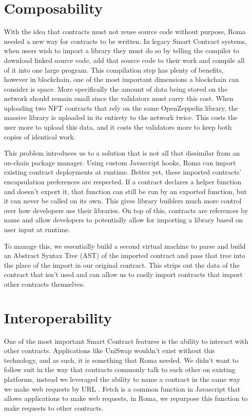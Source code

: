 \documentclass[a4paper]{article}
\begin{document}
\section{Composability}\label{sec:composability}
With the idea that contracts must not reuse source code without purpose, Roma needed a new way for contracts to be written.
In legacy Smart Contract systems, when users wish to import a library they must do so by telling the compiler to download linked source code, add that source code to their work and compile all of it into one large program.
This compilation step has plenty of benefits, however in blockchain, one of the most important dimensions a blockchain can consider is space.
More specifically the amount of data being stored on the network should remain small since the validators must carry this cost.
When uploading two NFT contracts that rely on the same OpenZeppelin library, the massive library is uploaded in its entirety to the network twice.
This costs the user more to upload this data, and it costs the validators more to keep both copies of identical work.

This problem introduces us to a solution that is not all that dissimilar from an on-chain package manager.
Using custom Javascript hooks, Roma can import existing contract deployments at runtime.
Better yet, these imported contracts' encapsulation preferences are respected.
If a contract declares a helper function and doesn't export it, that function can still be run by an exported function, but it can never be called on its own.
This gives library builders much more control over how developers use their libraries.
On top of this, contracts are references by name and allow developers to potentially allow for importing a library based on user input at runtime.

To manage this, we essentially build a second virtual machine to parse and build an Abstract Syntax Tree (AST)\cite{ast} of the imported contract and pass that tree into the place of the import in our original contract.
This strips out the data of the contract that isn't used and can allow us to easily import contracts that import other contracts themselves.

\section{Interoperability}\label{sec:interoperability}
One of the most important Smart Contract features is the ability to interact with other contracts.
Applications like UniSwap wouldn't exist without this technology, and as such, it is something that Roma needed.
We didn't want to follow suit in the way that contracts commonly talk to each other on existing platforms, instead we leveraged the ability to name a contract in the same way we make web requests by URL .
Fetch is a common function in Javascript that allows applications to make web requests, in Roma, we repurpose this function to make requests to other contracts.\cite{fetch}
\end{document}
